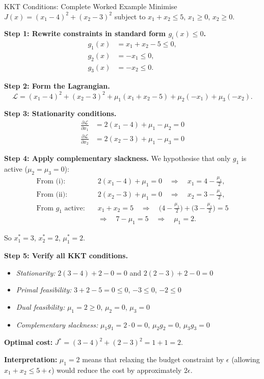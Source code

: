 \begin{examplebox}{KKT Conditions: Complete Worked Example}
	Minimise $J(x) = (x_1 - 4)^2 + (x_2 - 3)^2$ subject to $x_1 + x_2 \le 5$, $x_1 \ge 0$, $x_2 \ge 0$.

	\solution

	\textbf{Step 1: Rewrite constraints in standard form $g_i(x) \le 0$.}
	\begin{align*}
		g_1(x) &= x_1 + x_2 - 5 \le 0, \\
		g_2(x) &= -x_1 \le 0, \\
		g_3(x) &= -x_2 \le 0.
	\end{align*}

	\textbf{Step 2: Form the Lagrangian.}
	\[
	\mathcal{L} = (x_1-4)^2 + (x_2-3)^2 + \mu_1(x_1+x_2-5) + \mu_2(-x_1) + \mu_3(-x_2).
	\]

	\textbf{Step 3: Stationarity conditions.}
	\begin{align}
		\frac{\partial \mathcal{L}}{\partial x_1} &= 2(x_1 - 4) + \mu_1 - \mu_2 = 0 \tag{i} \\[4pt]
		\frac{\partial \mathcal{L}}{\partial x_2} &= 2(x_2 - 3) + \mu_1 - \mu_3 = 0 \tag{ii}
	\end{align}

	\textbf{Step 4: Apply complementary slackness.} We hypothesise that only $g_1$ is active ($\mu_2 = \mu_3 = 0$):
	\begin{align*}
		\text{From (i):} &\quad 2(x_1-4) + \mu_1 = 0 \quad\Longrightarrow\quad x_1 = 4 - \tfrac{\mu_1}{2}, \\[3pt]
		\text{From (ii):} &\quad 2(x_2-3) + \mu_1 = 0 \quad\Longrightarrow\quad x_2 = 3 - \tfrac{\mu_1}{2}, \\[3pt]
		\text{From } g_1 \text{ active:} &\quad x_1 + x_2 = 5 \quad\Longrightarrow\quad \bigl(4 - \tfrac{\mu_1}{2}\bigr) + \bigl(3 - \tfrac{\mu_1}{2}\bigr) = 5 \\
		&\quad\Longrightarrow\quad 7 - \mu_1 = 5 \quad\Longrightarrow\quad \mu_1 = 2.
	\end{align*}

	So $x_1^* = 3$, $x_2^* = 2$, $\mu_1^* = 2$.

	\textbf{Step 5: Verify all KKT conditions.}
	\begin{itemize}
		\item \emph{Stationarity:} $2(3-4)+2-0 = 0$ \checkmark \quad and \quad $2(2-3)+2-0 = 0$ \checkmark
		\item \emph{Primal feasibility:} $3+2-5 = 0 \le 0$, $-3 \le 0$, $-2 \le 0$ \checkmark
		\item \emph{Dual feasibility:} $\mu_1 = 2 \ge 0$, $\mu_2 = 0$, $\mu_3 = 0$ \checkmark
		\item \emph{Complementary slackness:} $\mu_1 g_1 = 2 \cdot 0 = 0$, $\mu_2 g_2 = 0$, $\mu_3 g_3 = 0$ \checkmark
	\end{itemize}

	\textbf{Optimal cost:} $J^* = (3-4)^2 + (2-3)^2 = 1 + 1 = 2$.

	\textbf{Interpretation:} $\mu_1 = 2$ means that relaxing the budget constraint by $\epsilon$ (allowing $x_1 + x_2 \le 5 + \epsilon$) would reduce the cost by approximately $2\epsilon$.
\end{examplebox}

